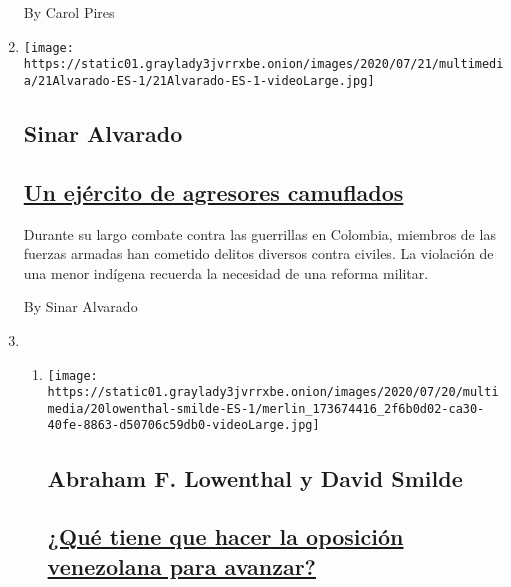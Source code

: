 \begin{enumerate}
  By Carol Pires
\item
  \texttt{[image: https://static01.graylady3jvrrxbe.onion/images/2020/07/21/multimedia/21Alvarado-ES-1/21Alvarado-ES-1-videoLarge.jpg]}

  \hypertarget{sinar-alvarado}{%
  \subsection{Sinar Alvarado}\label{sinar-alvarado}}

  \hypertarget{un-ejuxe9rcito-de-agresores-camuflados}{%
  \subsection{\texorpdfstring{\href{/es/2020/07/21/espanol/opinion/colombia-ejercito.html}{Un
  ejército de agresores
  camuflados}}{Un ejército de agresores camuflados}}\label{un-ejuxe9rcito-de-agresores-camuflados}}

  Durante su largo combate contra las guerrillas en Colombia, miembros
  de las fuerzas armadas han cometido delitos diversos contra civiles.
  La violación de una menor indígena recuerda la necesidad de una
  reforma militar.

  By Sinar Alvarado
\item
  \begin{enumerate}
  \def\labelenumii{\arabic{enumii}.}
  \item
    \texttt{[image: https://static01.graylady3jvrrxbe.onion/images/2020/07/20/multimedia/20lowenthal-smilde-ES-1/merlin\_173674416\_2f6b0d02-ca30-40fe-8863-d50706c59db0-videoLarge.jpg]}

    \hypertarget{abraham-f-lowenthal-y-david-smilde}{%
    \subsection{Abraham F. Lowenthal y David
    Smilde}\label{abraham-f-lowenthal-y-david-smilde}}

    \hypertarget{quuxe9-tiene-que-hacer-la-oposiciuxf3n-venezolana-para-avanzar}{%
    \subsection{\texorpdfstring{\href{/es/2020/07/20/espanol/opinion/venezuela-oposicion-guaido-maduro.html}{¿Qué
    tiene que hacer la oposición venezolana para
    avanzar?}}{¿Qué tiene que hacer la oposición venezolana para avanzar?}}\label{quuxe9-tiene-que-hacer-la-oposiciuxf3n-venezolana-para-avanzar}}


\end{enumerate}
\end{enumerate}
